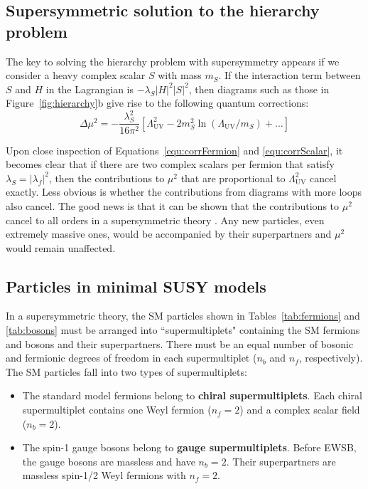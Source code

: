 \subsection{Supersymmetric solution to the hierarchy problem}
\label{sec:SUSYhierarchy}

The key to solving the hierarchy problem with supersymmetry appears if we consider a heavy complex scalar $S$ with mass $m_S$. If the interaction term between $S$ and $H$ in the Lagrangian is $-\lambda_S|H|^2|S|^2$, then diagrams such as those in Figure~\ref{fig:hierarchy}b give rise to the following quantum corrections:
\begin{equation}
\Delta\mu^2 = -\frac{\lambda_S^2}{16\pi^2} [ \Lambda^2_\mathrm{UV} - 2 m_S^2 \ln{(\Lambda_\mathrm{UV} / m_S) }+ ... ]
\label{equ:corrScalar}
\end{equation}

Upon close inspection of Equations~\ref{equ:corrFermion} and \ref{equ:corrScalar}, it becomes clear that if
there are two complex scalars per fermion that satisfy $\lambda_S = |\lambda_f|^2$, then the contributions to $\mu^2$ 
that are proportional to $ \Lambda^2_\mathrm{UV}$ cancel exactly. 
Less obvious is whether the contributions from diagrams with more loops also cancel. The good news is that it can be shown that 
the contributions to $\mu^2$ cancel to all orders in a supersymmetric theory \cite{SUSYproof}. Any new particles, even extremely massive ones, would be
accompanied by their superpartners and $\mu^2$ would remain unaffected.


\subsection{Particles in minimal SUSY models}
\label{sec:SUSYparticles}
In a supersymmetric theory, the SM particles shown in Tables~\ref{tab:fermions} and \ref{tab:bosons} must be arranged into ``supermultiplets" containing the SM fermions and bosons and their superpartners. There must be an equal number of bosonic and fermionic degrees of freedom in each supermultiplet ($n_b$ and $n_f$, respectively). The SM particles fall into two types of supermultiplets:
\begin{itemize}[leftmargin=*]
\item The standard model fermions belong to \textbf{chiral supermultiplets}. Each chiral supermultiplet contains one Weyl fermion ($n_f = 2$) and a complex scalar field ($n_b = 2$).
\item The spin-1 gauge bosons belong to \textbf{gauge supermultiplets}. Before EWSB, the gauge bosons are massless and have $n_b = 2$. Their superpartners are massless spin-1/2 Weyl fermions with $n_f = 2$. 
\end{itemize}

